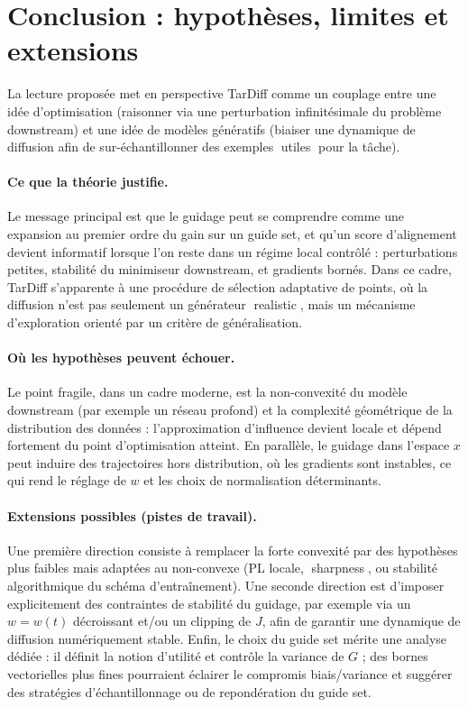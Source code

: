 \documentclass[11pt]{article}
\begin{document}
\section*{Conclusion : hypothèses, limites et extensions}
La lecture proposée met en perspective TarDiff comme un couplage entre une idée d'optimisation (raisonner via une perturbation infinitésimale du problème downstream) et une idée de modèles génératifs (biaiser une dynamique de diffusion afin de sur-échantillonner des exemples utiles pour la tâche).

\paragraph{Ce que la théorie justifie.}
Le message principal est que le guidage peut se comprendre comme une expansion au premier ordre du gain sur un guide set, et qu'un score d'alignement devient informatif lorsque l'on reste dans un régime local contrôlé : perturbations petites, stabilité du minimiseur downstream, et gradients bornés. Dans ce cadre, TarDiff s'apparente à une procédure de sélection adaptative de points, où la diffusion n'est pas seulement un générateur realistic, mais un mécanisme d'exploration orienté par un critère de généralisation.

\paragraph{Où les hypothèses peuvent échouer.}
Le point fragile, dans un cadre moderne, est la non-convexité du modèle downstream (par exemple un réseau profond) et la complexité géométrique de la distribution des données : l'approximation d'influence devient locale et dépend fortement du point d'optimisation atteint. En parallèle, le guidage dans l'espace $x$ peut induire des trajectoires hors distribution, où les gradients sont instables, ce qui rend le réglage de $w$ et les choix de normalisation déterminants.

\paragraph{Extensions possibles (pistes de travail).}
Une première direction consiste à remplacer la forte convexité par des hypothèses plus faibles mais adaptées au non-convexe (PL locale, sharpness, ou stabilité algorithmique du schéma d'entraînement).
Une seconde direction est d'imposer explicitement des contraintes de stabilité du guidage, par exemple via un $w=w(t)$ décroissant et/ou un clipping de $J$, afin de garantir une dynamique de diffusion numériquement stable.
Enfin, le choix du guide set mérite une analyse dédiée : il définit la notion d'utilité et contrôle la variance de $G$ ; des bornes vectorielles plus fines pourraient éclairer le compromis biais/variance et suggérer des stratégies d'échantillonnage ou de repondération du guide set.
\end{document}
